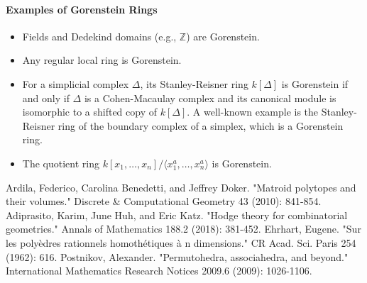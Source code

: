 \documentclass[12pt]{article}
\theoremstyle{definition}
\numberwithin{equation}{subsection}
\begin{document}
\paragraph{Examples of Gorenstein Rings}
\begin{itemize}
    \item Fields and Dedekind domains (e.g., $\mathbb{Z}$) are Gorenstein.
    \item Any regular local ring is Gorenstein.
    \item For a simplicial complex $\Delta$, its Stanley-Reisner ring $k[\Delta]$ is Gorenstein if and only if $\Delta$ is a Cohen-Macaulay complex and its canonical module is isomorphic to a shifted copy of $k[\Delta]$. A well-known example is the Stanley-Reisner ring of the boundary complex of a simplex, which is a Gorenstein ring.
    \item The quotient ring $k[x_1, \ldots, x_n]/\langle x_1^a, \ldots, x_n^a \rangle$ is Gorenstein.
\end{itemize}

\begin{thebibliography}{99}
     Ardila, Federico, Carolina Benedetti, and Jeffrey Doker. "Matroid polytopes and their volumes." Discrete \& Computational Geometry 43 (2010): 841-854.
     Adiprasito, Karim, June Huh, and Eric Katz. "Hodge theory for combinatorial geometries." Annals of Mathematics 188.2 (2018): 381-452.
     Ehrhart, Eugene. "Sur les polyèdres rationnels homothétiques à n dimensions." CR Acad. Sci. Paris 254 (1962): 616.
     Postnikov, Alexander. "Permutohedra, associahedra, and beyond." International Mathematics Research Notices 2009.6 (2009): 1026-1106.
\end{thebibliography}
\end{document}
